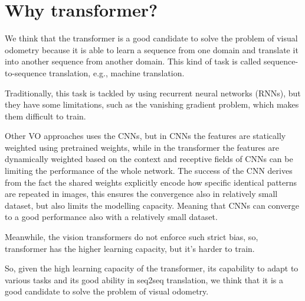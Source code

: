 \section{Why transformer?}\label{sec:why-transformer}

We think that the transformer is a good candidate to solve the problem of visual odometry because it is able to learn a sequence from one domain and translate it into another sequence from another domain.
This kind of task is called sequence-to-sequence translation, e.g., machine translation.

Traditionally, this task is tackled by using recurrent neural networks (RNNs), but they have some limitations, such as the vanishing gradient problem, which makes them difficult to train.

Other VO approaches uses the CNNs, but in CNNs the features are statically weighted using pretrained weights, while in the transformer the features are dynamically weighted based on the context and receptive fields of CNNs can be limiting the performance of the whole network.
The success of the CNN derives from the fact the shared weights explicitly encode how specific identical patterns are repeated in images, this ensures the convergence also in relatively small dataset, but also limits the modelling capacity.
Meaning that CNNs can converge to a good performance also with a relatively small dataset.

Meanwhile, the vision transformers do not enforce such strict bias, so, transformer has the higher learning capacity, but it's harder to train.

So, given the high learning capacity of the transformer, its capability to adapt to various tasks and its good ability in seq2seq translation, we think that it is a good candidate to solve the problem of visual odometry.
